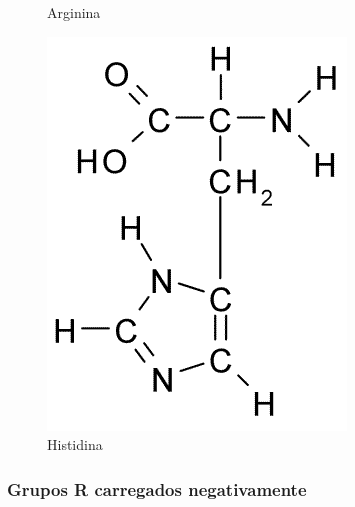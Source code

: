 \begin{figure}[H]
\begin{center}
\begin{minipage}{0.3\linewidth}
			\caption{Arginina}
			\label{fig:arginine}
		\end{minipage}
		\begin{minipage}{0.3\linewidth}
			\centering   
			\includegraphics[width=0.7\linewidth]{secProteins/figures/histidine.png}
			\caption{Histidina}
			\label{fig:histidine}
		\end{minipage}
	\end{center}
\end{figure}

\subsubsection*{Grupos R carregados negativamente}

